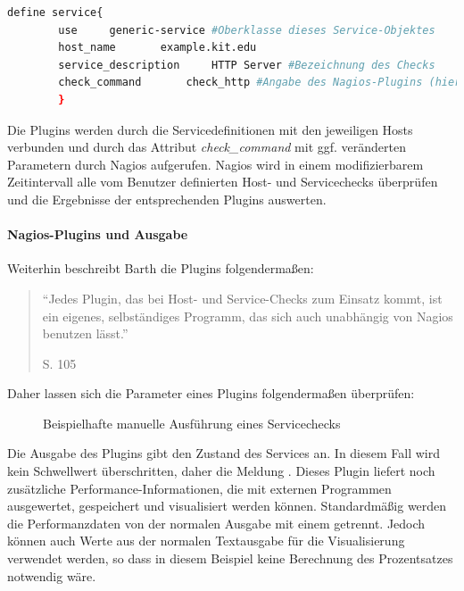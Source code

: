 \begin{lstlisting}[captionpos=b, caption=Verkürzte Definition eines Hostobjektes, label=servdef, breaklines = true, language=sh]
define service{
        use		generic-service #Oberklasse dieses Service-Objektes
        host_name		example.kit.edu
        service_description     HTTP Server #Bezeichnung des Checks
        check_command		check_http #Angabe des Nagios-Plugins (hier ohne Parameter)
        }
\end{lstlisting}

Die Plugins werden durch die Servicedefinitionen mit den jeweiligen Hosts verbunden und durch das Attribut \textit{check\_command} mit ggf. veränderten Parametern durch Nagios aufgerufen.
Nagios wird in einem modifizierbarem Zeitintervall alle vom Benutzer definierten Host- und Servicechecks überprüfen und die Ergebnisse der entsprechenden Plugins auswerten.
\paragraph{Nagios-Plugins und Ausgabe}
Weiterhin beschreibt Barth die Plugins folgendermaßen:
\begin{quote}"`Jedes Plugin, das bei Host- und Service-Checks zum Einsatz kommt, ist ein eigenes, selbständiges Programm, das sich auch unabhängig von Nagios benutzen lässt."' \begin{flushright}\cite{Barth08} S. 105\end{flushright}\end{quote} 
Daher lassen sich die Parameter eines Plugins folgendermaßen überprüfen:

\begin{figure}[ht]
	\centering
		\caption{Beispielhafte manuelle Ausführung eines Servicechecks}
		\label{check-swap}
\end{figure}

Die Ausgabe des Plugins gibt den Zustand des Services an.
In diesem Fall wird kein Schwellwert überschritten, daher die Meldung .
Dieses Plugin liefert noch zusätzliche Performance-Informationen, die mit externen Programmen ausgewertet, gespeichert und visualisiert werden können.
Standardmäßig werden die Performanzdaten von der normalen Ausgabe mit einem \pictext{|} getrennt.
Jedoch können auch Werte aus der normalen Textausgabe für die Visualisierung verwendet werden, so dass in diesem Beispiel keine Berechnung des Prozentsatzes notwendig wäre.

